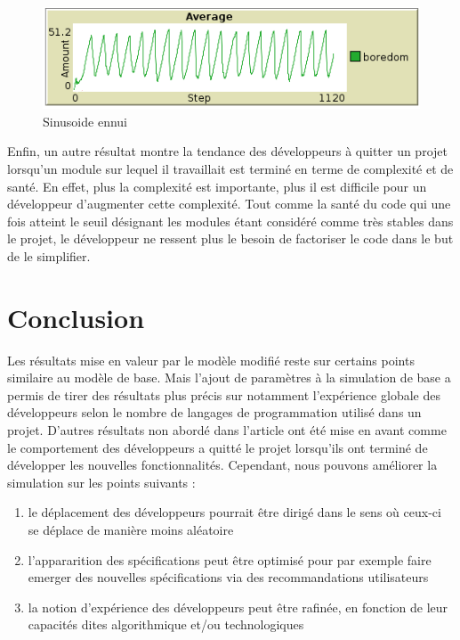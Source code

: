 \documentclass{article}
\begin{document}
\begin{figure}[H]
  \centerline{\includegraphics[scale=1]{pictures/sinusoide_ennui.png}}
  \caption{Sinusoide ennui}
\end{figure}

Enfin, un autre résultat montre la tendance des développeurs à quitter un projet lorsqu'un module sur lequel il travaillait est terminé en terme de complexité et de santé. En effet, plus la complexité est importante, plus il est difficile pour un développeur d'augmenter cette complexité. Tout comme la santé du code qui une fois atteint le seuil désignant les modules étant considéré comme très stables dans le projet, le développeur ne ressent plus le besoin de factoriser le code dans le but de le simplifier.


\section{Conclusion}
Les résultats mise en valeur par le modèle modifié reste sur certains points similaire au modèle de base.
Mais l'ajout de paramètres à la simulation de base a permis de tirer des
résultats plus précis sur notamment l'expérience globale des développeurs selon le nombre de langages de programmation
utilisé dans un projet. D'autres résultats non abordé dans l'article ont été mise en avant comme le comportement des développeurs
a quitté le projet lorsqu'ils ont terminé de développer les nouvelles fonctionnalités. Cependant, nous pouvons améliorer la simulation sur les
points suivants :
\begin{enumerate}
\item{le déplacement des développeurs pourrait être dirigé dans le sens où ceux-ci se déplace de manière moins aléatoire}
\item{l'appararition des spécifications peut être optimisé pour par exemple faire emerger des nouvelles spécifications via des recommandations utilisateurs}
\item{la notion d'expérience des développeurs peut être rafinée, en
    fonction de leur capacités dites algorithmique et/ou technologiques}
\end{enumerate}
\end{document}
